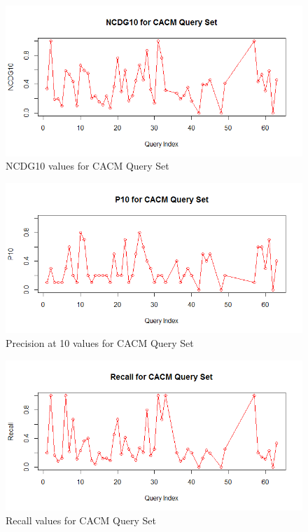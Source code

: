 \documentclass[12pt]{report}
\begin{document}
\begin{figure}[ht]
  \centering
  \includegraphics[width=1\textwidth]{Problem8_5/NCDG10.png}
  \caption{NCDG10 values for CACM Query Set}
  \label{fig:1}
\end{figure}

\begin{figure}[ht]
  \centering
  \includegraphics[width=1\textwidth]{Problem8_5/P10.png}
  \caption{Precision at 10 values for CACM Query Set}
  \label{fig:1}
\end{figure}

\begin{figure}[ht]
  \centering
  \includegraphics[width=1\textwidth]{Problem8_5/Recall.png}
  \caption{Recall values for CACM Query Set}
  \label{fig:1}
\end{figure}
\end{document}
